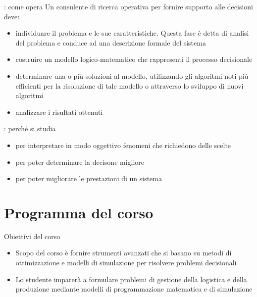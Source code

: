 \documentclass{beamer}
\begin{document}
\begin{frame}{\insegnamento: come opera}
 Un consulente di ricerca operativa per fornire supporto alle decisioni deve:
  \begin{itemize}
    \item individuare il problema e le sue caratteristiche.
    Questa fase \`e detta di analisi del problema e conduce ad una descrizione
    formale del sistema
    \item costruire un modello logico-matematico che rappresenti il processo decisionale
    \item determinare una o pi\`u soluzioni al modello, utilizzando gli algoritmi noti pi\`u
    efficienti per la risoluzione di tale modello o attraverso lo sviluppo di nuovi algoritmi
    \item analizzare i risultati ottenuti
  \end{itemize}
\end{frame}

\begin{frame}{\insegnamento: perch\'e si studia}
  \begin{itemize}
    \item per interpretare in modo oggettivo fenomeni che richiedono delle scelte
    \item per poter determinare la decisone migliore
    \item per poter migliorare le prestazioni di un sistema
  \end{itemize}

\end{frame}

\section{Programma del corso}

\begin{frame}{Obiettivi del corso}

  \begin{itemize}
    \item Scopo del corso \`e fornire strumenti avanzati che si basano
	  su metodi di ottimizzazione e modelli di simulazione per
	  risolvere problemi decisionali
	  
    \item Lo studente imparer\`a a formulare problemi di gestione della
	  logistica e della produzione mediante modelli di programmazione
	  matematica e di simulazione
  \end{itemize}
\end{frame}
\end{document}
